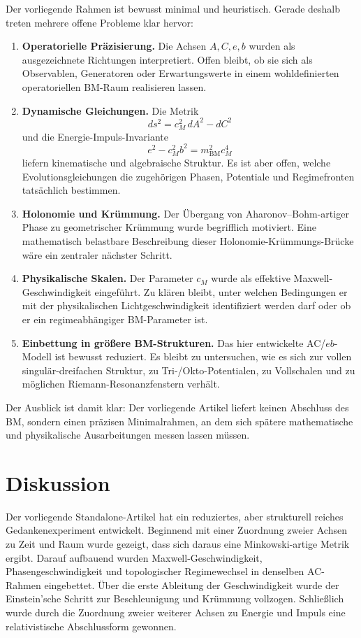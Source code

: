 \documentclass[11pt,a4paper]{article}
\theoremstyle{definition}
\theoremstyle{plain}
\begin{document}
	Der vorliegende Rahmen ist bewusst minimal und heuristisch. Gerade deshalb treten mehrere offene Probleme klar hervor:
	\begin{enumerate}[leftmargin=2em]
		\item \textbf{Operatorielle Präzisierung.} Die Achsen $A,C,e,b$ wurden als ausgezeichnete Richtungen interpretiert. Offen bleibt, ob sie sich als Observablen, Generatoren oder Erwartungswerte in einem wohldefinierten operatoriellen BM-Raum realisieren lassen.
		\item \textbf{Dynamische Gleichungen.} Die Metrik
		\[
		ds^2 = c_M^2\, dA^2 - dC^2
		\]
		und die Energie-Impuls-Invariante
		\[
		e^2 - c_M^2 b^2 = m_{\mathrm{BM}}^2 c_M^4
		\]
		liefern kinematische und algebraische Struktur. Es ist aber offen, welche Evolutionsgleichungen die zugehörigen Phasen, Potentiale und Regimefronten tatsächlich bestimmen.
		\item \textbf{Holonomie und Krümmung.} Der Übergang von Aharonov--Bohm-artiger Phase zu geometrischer Krümmung wurde begrifflich motiviert. Eine mathematisch belastbare Beschreibung dieser Holonomie-Krümmungs-Brücke wäre ein zentraler nächster Schritt.
		\item \textbf{Physikalische Skalen.} Der Parameter $c_M$ wurde als effektive Maxwell-Geschwindigkeit eingeführt. Zu klären bleibt, unter welchen Bedingungen er mit der physikalischen Lichtgeschwindigkeit identifiziert werden darf oder ob er ein regimeabhängiger BM-Parameter ist.
		\item \textbf{Einbettung in größere BM-Strukturen.} Das hier entwickelte AC/$eb$-Modell ist bewusst reduziert. Es bleibt zu untersuchen, wie es sich zur vollen singulär-dreifachen Struktur, zu Tri-/Okto-Potentialen, zu Vollschalen und zu möglichen Riemann-Resonanzfenstern verhält.
	\end{enumerate}
	
	Der Ausblick ist damit klar: Der vorliegende Artikel liefert keinen Abschluss des BM, sondern einen präzisen Minimalrahmen, an dem sich spätere mathematische und physikalische Ausarbeitungen messen lassen müssen.
	
	\section{Diskussion}
	
	Der vorliegende Standalone-Artikel hat ein reduziertes, aber strukturell reiches Gedankenexperiment entwickelt. Beginnend mit einer Zuordnung zweier Achsen zu Zeit und Raum wurde gezeigt, dass sich daraus eine Minkowski-artige Metrik ergibt. Darauf aufbauend wurden Maxwell-Geschwindigkeit, Phasengeschwindigkeit und topologischer Regimewechsel in denselben AC-Rahmen eingebettet. Über die erste Ableitung der Geschwindigkeit wurde der Einstein’sche Schritt zur Beschleunigung und Krümmung vollzogen. Schließlich wurde durch die Zuordnung zweier weiterer Achsen zu Energie und Impuls eine relativistische Abschlussform gewonnen.
	
\end{document}
